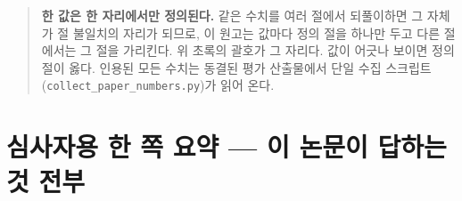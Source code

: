 \documentclass[10pt,a4paper]{article}
\begin{document}
\begin{abstract}
\begin{fielddesc}[5.4em]
\item[주장 2: 회전] 회전도 평균 제곱 오차가 낮지만, 그 이득은 CES 이력에서만 온다.
새 분할 8벌의 등록된 두 단계 bootstrap에서 PCHIP 대비 skill의 95\% 구간은
$[+0.07, +0.70]$(컷), $[+0.05, +0.68]$(포함)로 0을 제외한다(겹 단위 겹침 보정 구간
$[-0.02, +0.41]$은 0을 포함한다). 꼬리가 실어 나르는 이득이다. \Vrot{} 분기는 고속
채널을 읽지 않으며, 이 라우팅은 가정이 아니라 측정이다: 고속 채널과 $d\Vrot/dt$의
상관은 $-0.006$(BES)·$-0.003$(ECEI)으로, $d\Ti/dt$와의 $+0.070$·$+0.078$에 비해 0에
가깝다. 100\,Hz Mirnov 값은 원시 표본 하나의 스냅숏이고(점검한 코일 24개 모두), 원시
2\,MHz 스트림의 등록 특징은 \Vrot{} skill을 $-0.128$ $[-0.544, -0.105]$만큼
바꾼다(컷, 시험 방전 3개). NBI 토크는 계단 입력이어서 느린 띠가 10\,ms 증분 분산의
0.34\%만 담는다. 중앙값에서 나우캐스터는 persistence보다 나쁘고, 물리 필터의
persistence 대비 오차 비는 0.94--1.00으로 3/4 분할에서 구간이 1을 포함한다. 이는
10\,ms 선 맞춤의 광자 바닥이다. 이 진술은 표준 CES 10\,ms 격자·코어에서 페데스탈
상단까지에 한정한다(\S\ref{sec:asym}, \S\ref{sec:physfilter}, \S\ref{sec:headroom}).

\item[한계] 집계 skill은 꼬리 통계이고, 오프라인 주장의 상한은 오프라인 GP이며, 값
기준 컷은 피팅 품질의 대리 지표이고, 모든 것이 한 장치·한 캠페인이다(\S\ref{sec:limits}).

\item[공개] 전체 파이프라인, 사전등록 문서, 평가 산출물을 공개한다.

\end{fielddesc}
\end{abstract}

\begin{quote}
\textbf{한 값은 한 자리에서만 정의된다.} 같은 수치를 여러 절에서 되풀이하면 그
자체가 절 불일치의 자리가 되므로, 이 원고는 값마다 정의 절을 하나만 두고 다른
절에서는 그 절을 가리킨다. 위 초록의 괄호가 그 자리다. 값이 어긋나 보이면 정의
절이 옳다. 인용된 모든 수치는 동결된 평가 산출물에서 단일 수집
스크립트(\texttt{collect\_paper\_numbers.py})가 읽어 온다.
\end{quote}

\clearpage
\tableofcontents
\clearpage

\section*{심사자용 한 쪽 요약 --- 이 논문이 답하는 것 전부}
\label{sec:onepager}
\end{document}
